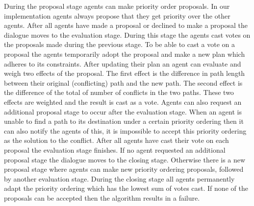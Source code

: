 During the proposal stage agents can make priority order proposals. In our 
implementation agents always propose that they get priority over the other 
agents. After all agents have made a proposal or declined to make a proposal 
the dialogue moves to the evaluation stage. During this stage the agents cast 
votes on the proposals made during the previous stage. To be able to cast a 
vote on a proposal the agents temporarily adopt the proposal and make a new 
plan which adheres to its constraints. After updating their plan an agent can 
evaluate and weigh two effects of the proposal. The first effect is the 
difference in path length between their original (conflicting) path and the new 
path. The second effect is the difference of the total of number of conflicts 
in the two paths. These two effects are weighted and the result is cast as a 
vote. Agents can also request an additional proposal stage to occur after the 
evaluation stage. When an agent is unable to find a path to its destination 
under a certain priority ordering then it can also notify the agents of this, 
it is impossible to accept this priority ordering as the solution to the 
conflict. After all agents have cast their vote on each proposal the evaluation 
stage finishes. If no agent requested an additional proposal stage the dialogue 
moves to the closing stage. Otherwise there is a new proposal stage where 
agents can make new priority ordering proposals, followed by another evaluation 
stage. During the closing stage all agents permanently adapt the priority 
ordering which has the lowest sum of votes cast. If none of the proposals can 
be accepted then the algorithm results in a failure.


